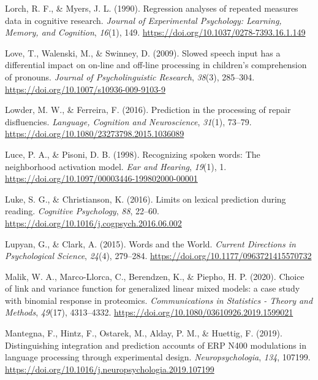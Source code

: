 \documentclass[a4paper, nobind]{templates/ociamthesis}
\newlength{\cslhangindent}
\newenvironment{CSLReferences}[2] %
 {%
  \setlength{\parindent}{0pt}
  \ifodd #1
  \let\oldpar\par
  \def\par{\hangindent=\cslhangindent\oldpar}
  \fi
  \setlength{\parskip}{1mm}
  \setlength{\baselineskip}{6mm}
 }%
 {}
\begin{document}
\begin{CSLReferences}{1}{0}
\leavevmode{}%
Lorch, R. F., \& Myers, J. L. (1990). Regression analyses of repeated measures data in cognitive research. \emph{Journal of Experimental Psychology: Learning, Memory, and Cognition}, \emph{16}(1), 149. \url{https://doi.org/10.1037/0278-7393.16.1.149}

\leavevmode{}%
Love, T., Walenski, M., \& Swinney, D. (2009). {Slowed speech input has a differential impact on on-line and off-line processing in children's comprehension of pronouns}. \emph{Journal of Psycholinguistic Research}, \emph{38}(3), 285--304. \url{https://doi.org/10.1007/s10936-009-9103-9}

\leavevmode{}%
Lowder, M. W., \& Ferreira, F. (2016). {Prediction in the processing of repair disfluencies}. \emph{Language, Cognition and Neuroscience}, \emph{31}(1), 73--79. \url{https://doi.org/10.1080/23273798.2015.1036089}

\leavevmode{}%
Luce, P. A., \& Pisoni, D. B. (1998). Recognizing spoken words: The neighborhood activation model. \emph{Ear and Hearing}, \emph{19}(1), 1. \url{https://doi.org/10.1097/00003446-199802000-00001}

\leavevmode{}%
Luke, S. G., \& Christianson, K. (2016). Limits on lexical prediction during reading. \emph{Cognitive Psychology}, \emph{88}, 22--60. \url{https://doi.org/10.1016/j.cogpsych.2016.06.002}

\leavevmode{}%
Lupyan, G., \& Clark, A. (2015). Words and the World. \emph{Current Directions in Psychological Science}, \emph{24}(4), 279--284. \url{https://doi.org/10.1177/0963721415570732}

\leavevmode{}%
Malik, W. A., Marco-Llorca, C., Berendzen, K., \& Piepho, H. P. (2020). {Choice of link and variance function for generalized linear mixed models: a case study with binomial response in proteomics}. \emph{Communications in Statistics - Theory and Methods}, \emph{49}(17), 4313--4332. \url{https://doi.org/10.1080/03610926.2019.1599021}

\leavevmode{}%
Mantegna, F., Hintz, F., Ostarek, M., Alday, P. M., \& Huettig, F. (2019). Distinguishing integration and prediction accounts of ERP N400 modulations in language processing through experimental design. \emph{Neuropsychologia}, \emph{134}, 107199. \url{https://doi.org/10.1016/j.neuropsychologia.2019.107199}


\end{CSLReferences}
\end{document}
